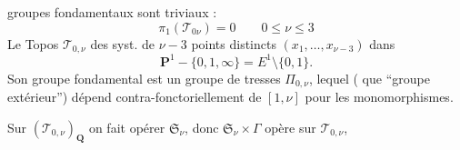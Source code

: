 groupes fondamentaux sont  triviaux :
%
\[
\pi_1(\mathcal T_{0\nu})=0\qquad 0\leq\nu\leq3
\]
Le Topos $\mathcal T_{0,\nu}$     des syst. de $\nu-3$ points distincts $(x_1,\ldots,x_{\nu-3})$ dans
\[
\mathbf P^1-\{0,1,\infty\}=E^1\setminus\{0,1\}.
\]
Son groupe fondamental est un groupe de tresses $\Pi_{0,\nu}$, lequel ( que ``groupe extérieur'') dépend contra-fonctoriellement de $[1,\nu]$ pour les monomorphismes.

Sur $(\mathcal T_{0,\nu})_{\mathbf Q}$ on  fait opérer  $\mathfrak S_\nu$, donc $\mathfrak S_\nu\times\Gamma$ opère sur $\mathcal T_{0,\nu}$,
